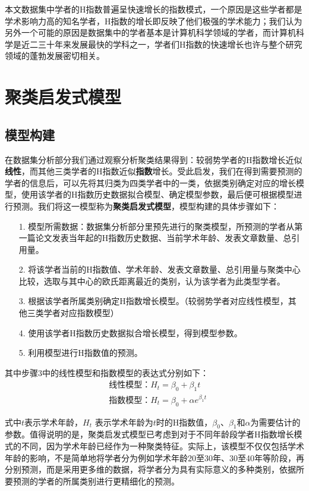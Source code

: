 \documentclass[lang=cn,11pt,a4paper,cite=authoryear]{elegantpaper}
\begin{document}
本文数据集中学者的H指数普遍呈快速增长的指数模式，一个原因是这些学者都是学术影响力高的知名学者，H指数的增长即反映了他们极强的学术能力；我们认为另外一个可能的原因是数据集中的学者基本是计算机科学领域的学者，而计算机科学是近二三十年来发展最快的学科之一，学者们H指数的快速增长也许与整个研究领域的蓬勃发展密切相关。

\section{聚类启发式模型}

\subsection{模型构建}

在数据集分析部分我们通过观察分析聚类结果得到：较弱势学者的H指数增长近似\textbf{线性}，而其他三类学者的H指数近似\textbf{指数}增长。受此启发，我们在得到需要预测的学者的信息后，可以先将其归类为四类学者中的一类，依据类别确定对应的增长模型，使用该学者的H指数历史数据拟合模型、确定模型参数，最后便可根据模型进行预测。我们将这一模型称为\textbf{聚类启发式模型}，模型构建的具体步骤如下：

\begin{itemize}
	\item[1.] 模型所需数据：数据集分析部分里预先进行的聚类模型，所预测的学者从第一篇论文发表当年起的H指数历史数据、当前学术年龄、发表文章数量、总引用量。
	\item[2.] 将该学者当前的H指数值、学术年龄、发表文章数量、总引用量与聚类中心比较，选取与其中心的欧氏距离最近的类别，认为该学者为此类型学者。
	\item[3.] 根据该学者所属类别确定H指数增长模型。（较弱势学者对应线性模型，其他三类学者对应指数模型）
	\item[4.] 使用该学者H指数历史数据拟合增长模型，得到模型参数。
	\item[5.] 利用模型进行H指数值的预测。
\end{itemize}

其中步骤3中的线性模型和指数模型的表达式分别如下：
\begin{align*}
& \text{线性模型：} H_t = \beta_0 + \beta_1 t\\
& \text{指数模型：} H_t = \beta_0 + \alpha e^{\beta_1t}
\end{align*}

式中$t$表示学术年龄，$H_t$ 表示学术年龄为$t$时的H指数值，$\beta_0$、$\beta_1$和$\alpha$为需要估计的参数。值得说明的是，聚类启发式模型已考虑到对于不同年龄段学者H指数增长模式的不同，因为学术年龄已经作为一种聚类特征。实际上，该模型不仅仅包括学术年龄的影响，不是简单地将学者分为例如学术年龄20至30年、30至40年等阶段，再分别预测，而是采用更多维的数据，将学者分为具有实际意义的多种类别，依据所要预测的学者的所属类别进行更精细化的预测。
\end{document}
